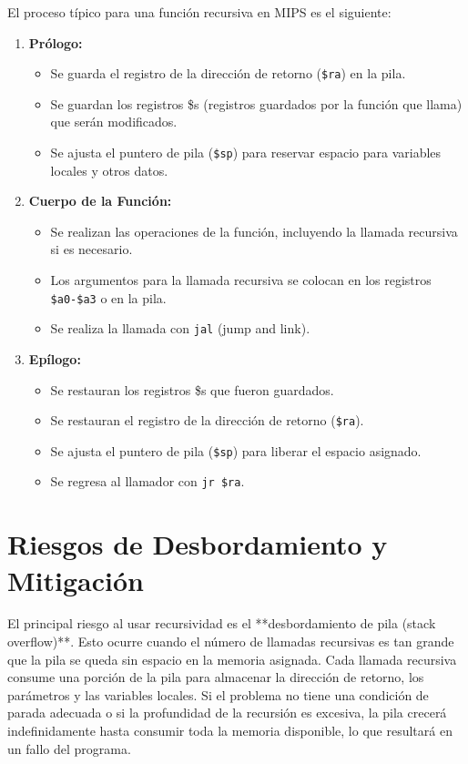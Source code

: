 \documentclass{article}
\begin{document}
El proceso típico para una función recursiva en MIPS es el siguiente:
\begin{enumerate}
    \item \textbf{Prólogo:}
    \begin{itemize}
        \item Se guarda el registro de la dirección de retorno (\texttt{\$ra}) en la pila.
        \item Se guardan los registros \$s (registros guardados por la función que llama) que serán modificados.
        \item Se ajusta el puntero de pila (\texttt{\$sp}) para reservar espacio para variables locales y otros datos.
    \end{itemize}
    \item \textbf{Cuerpo de la Función:}
    \begin{itemize}
        \item Se realizan las operaciones de la función, incluyendo la llamada recursiva si es necesario.
        \item Los argumentos para la llamada recursiva se colocan en los registros \texttt{\$a0-\$a3} o en la pila.
        \item Se realiza la llamada con \texttt{jal} (jump and link).
    \end{itemize}
    \item \textbf{Epílogo:}
    \begin{itemize}
        \item Se restauran los registros \$s que fueron guardados.
        \item Se restauran el registro de la dirección de retorno (\texttt{\$ra}).
        \item Se ajusta el puntero de pila (\texttt{\$sp}) para liberar el espacio asignado.
        \item Se regresa al llamador con \texttt{jr \$ra}.
    \end{itemize}
\end{enumerate}

\section{Riesgos de Desbordamiento y Mitigación}

El principal riesgo al usar recursividad es el **desbordamiento de pila (stack overflow)**. Esto ocurre cuando el número de llamadas recursivas es tan grande que la pila se queda sin espacio en la memoria asignada. Cada llamada recursiva consume una porción de la pila para almacenar la dirección de retorno, los parámetros y las variables locales. Si el problema no tiene una condición de parada adecuada o si la profundidad de la recursión es excesiva, la pila crecerá indefinidamente hasta consumir toda la memoria disponible, lo que resultará en un fallo del programa.
\end{document}
